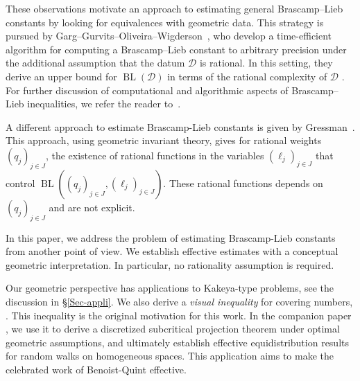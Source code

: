 \documentclass[a4paper,english]{amsart}
\theoremstyle{definition}
\newcommand{\1}{\mathbbm{1}}
\newcommand{\sD} {{\mathscr D}}
\DeclareMathOperator{\BL}{BL}
\begin{document}


These observations motivate an approach to estimating general Brascamp–Lieb constants by looking for equivalences with geometric data. This strategy is pursued by Garg–Gurvits–Oliveira–Wigderson~\cite{GGOW}, who develop a time-efficient algorithm for computing a Brascamp–Lieb constant to arbitrary precision under the additional assumption that the datum $\sD$ is rational. In this setting, they derive an upper bound for $\BL(\sD)$ in terms of the rational complexity of $\sD$ \cite[Theorem 1.4]{GGOW}. For further discussion of computational and algorithmic aspects of Brascamp–Lieb inequalities, we refer the reader to~\cite{GGOW}.

A different approach to estimate Brascamp-Lieb constants is given by Gressman~\cite[Lemma 2]{Gressman}.
This approach, using geometric invariant theory, gives for rational weights $(q_j)_{j \in J}$, the existence of rational functions in the variables $(\ell_j)_{j \in J}$ that control $\BL((q_j)_{j \in J}, (\ell_j)_{j \in J})$. These rational functions depends on $(q_j)_{j \in J}$ and are not explicit.

In this paper, we address the problem of estimating Brascamp-Lieb constants from another point of view. We establish effective estimates with a conceptual geometric interpretation. In particular, no rationality assumption is required.


\bigskip
{}
Our geometric perspective has  applications to Kakeya-type problems, see the discussion in \S\ref{Sec-appli}.
We also derive a \emph{visual inequality} for covering numbers, . This inequality is the original motivation for this work. In the companion paper \cite{BH25-walks}, we use it to derive a discretized subcritical projection theorem under optimal geometric assumptions, and ultimately establish effective equidistribution results for random walks on homogeneous spaces. This application aims to make the celebrated work of Benoist-Quint \cite{BQ1} effective.
\end{document}

